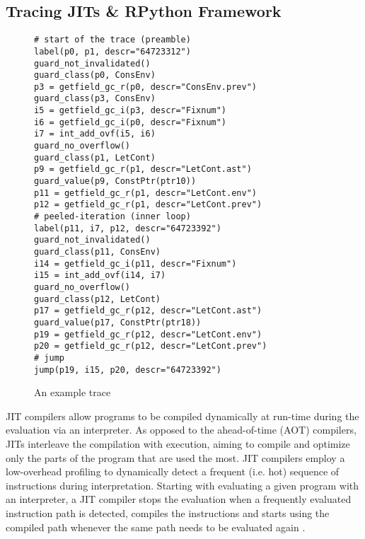 \subsection{Tracing JITs \& RPython Framework}
\label{subsec:rpython}

  \begin{wrapfigure}[21]{r}{0.35\textwidth}
    \vspace{-0.8cm}
    \centering
    \begin{minipage}[t]{0.32\textwidth}
      \begin{verbatim}
# start of the trace (preamble)
label(p0, p1, descr="64723312")
guard_not_invalidated()
guard_class(p0, ConsEnv)
p3 = getfield_gc_r(p0, descr="ConsEnv.prev")
guard_class(p3, ConsEnv)
i5 = getfield_gc_i(p3, descr="Fixnum")
i6 = getfield_gc_i(p0, descr="Fixnum")
i7 = int_add_ovf(i5, i6)
guard_no_overflow()
guard_class(p1, LetCont)
p9 = getfield_gc_r(p1, descr="LetCont.ast")
guard_value(p9, ConstPtr(ptr10))
p11 = getfield_gc_r(p1, descr="LetCont.env")
p12 = getfield_gc_r(p1, descr="LetCont.prev")
# peeled-iteration (inner loop)
label(p11, i7, p12, descr="64723392")
guard_not_invalidated()
guard_class(p11, ConsEnv)
i14 = getfield_gc_i(p11, descr="Fixnum")
i15 = int_add_ovf(i14, i7)
guard_no_overflow()
guard_class(p12, LetCont)
p17 = getfield_gc_r(p12, descr="LetCont.ast")
guard_value(p17, ConstPtr(ptr18))
p19 = getfield_gc_r(p12, descr="LetCont.env")
p20 = getfield_gc_r(p12, descr="LetCont.prev")
# jump
jump(p19, i15, p20, descr="64723392")

    \end{verbatim}
    \end{minipage}
    \caption{\small An example trace}
    \label{fig:trace}
  \end{wrapfigure}

JIT compilers allow programs to be compiled dynamically at run-time
during the evaluation via an interpreter. As opposed to the
ahead-of-time (AOT) compilers, JITs interleave the compilation with
execution, aiming to compile and optimize only the parts of the
program that are used the most. JIT compilers employ a low-overhead
profiling to dynamically detect a frequent (i.e. hot) sequence of
instructions during interpretation. Starting with evaluating a given
program with an interpreter, a JIT compiler stops the evaluation when
a frequently evaluated instruction path is detected, compiles the
instructions and starts using the compiled path whenever the same path
needs to be evaluated again \cite{dynamo}.

